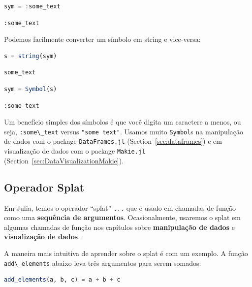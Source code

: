 \documentclass[
  notoc %
]{tufte-book}
\newcommand{\passthrough}[1]{#1}
\begin{document}
\begin{lstlisting}[language=Julia]
sym = :some_text
\end{lstlisting}

\begin{lstlisting}[language=Output]
:some_text
\end{lstlisting}

Podemos facilmente converter um símbolo em string e vice-versa:

\begin{lstlisting}[language=Julia]
s = string(sym)
\end{lstlisting}

\begin{lstlisting}[language=Output]
some_text
\end{lstlisting}

\begin{lstlisting}[language=Julia]
sym = Symbol(s)
\end{lstlisting}

\begin{lstlisting}[language=Output]
:some_text
\end{lstlisting}

Um benefício simples dos símbolos é que você digita um caractere a
menos, ou seja, \passthrough{\lstinline!:some\_text!} versus
\passthrough{\lstinline!"some text"!}. Usamos muito
\passthrough{\lstinline!Symbol!}s na manipulação de dados com o package
\passthrough{\lstinline!DataFrames.jl!} (Section~\ref{sec:dataframes}) e
em visualização de dados com o package
\passthrough{\lstinline!Makie.jl!}
(Section~\ref{sec:DataVisualizationMakie}).

\hypertarget{sec:splat}{%
\subsection{Operador Splat}\label{sec:splat}}

Em Julia, temos o operador ``splat'' \passthrough{\lstinline!...!} que é
usado em chamadas de função como uma \textbf{sequência de argumentos}.
Ocasionalmente, usaremos o splat em algumas chamadas de função nos
capítulos sobre \textbf{manipulação de dados} e \textbf{visualização de
dados}.

A maneira mais intuitiva de aprender sobre o splat é com um exemplo. A
função \passthrough{\lstinline!add\_elements!} abaixo leva três
argumentos para serem somados:

\begin{lstlisting}[language=Julia]
add_elements(a, b, c) = a + b + c
\end{lstlisting}
\end{document}
